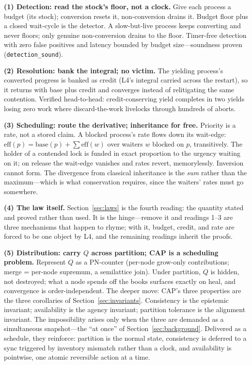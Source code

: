 \documentclass[11pt]{article}
\begin{document}
\textbf{(1) Detection: read the stock's floor, not a clock.} Give each
process a budget (its stock); conversion resets it, non-conversion
drains it. Budget floor plus a closed wait-cycle is the detector. A
slow-but-live process keeps converting and never floors; only genuine
non-conversion drains to the floor. Timer-free detection with zero
false positives and latency bounded by budget size---soundness proven
(\texttt{detection\_sound}).

\textbf{(2) Resolution: bank the integral; no victim.} The yielding
process's converted progress is banked as credit (L4's integral carried
across the restart), so it returns with base plus credit and converges
instead of relitigating the same contention. Verified head-to-head:
credit-conserving yield completes in two yields losing zero work where
discard-the-work livelocks through hundreds of aborts.

\textbf{(3) Scheduling: route the derivative; inheritance for free.}
Priority is a rate, not a stored claim. A blocked process's rate flows
down its wait-edge: $\mathrm{eff}(p) = \mathrm{base}(p) + \sum
\mathrm{eff}(w)$ over waiters $w$ blocked on $p$, transitively. The
holder of a contended lock is funded in exact proportion to the urgency
waiting on it; on release the wait-edge vanishes and rates revert,
memorylessly. Inversion cannot form. The divergence from classical
inheritance is the \emph{sum} rather than the maximum---which is what
conservation requires, since the waiters' rates must go somewhere.

\textbf{(4) The law itself.} Section~\ref{sec:laws} is the fourth
reading: the quantity stated and proved rather than used. It is the
hinge---remove it and readings 1--3 are three mechanisms that happen to
rhyme; with it, budget, credit, and rate are forced to be one object by
L4, and the remaining readings inherit the proofs.

\textbf{(5) Distribution: carry $Q$ across partition; CAP is a
scheduling problem.} Represent $Q$ as a PN-counter (per-node grow-only
contributions; merge = per-node supremum, a semilattice join). Under
partition, $Q$ is hidden, not destroyed; what a node spends off the
books surfaces exactly on heal, and convergence is order-independent.
The deeper move: CAP's three properties are the three corollaries of
Section~\ref{sec:invariants}. Consistency is the epistemic invariant;
availability is the agency invariant; partition tolerance is the
alignment invariant. The impossibility arises only when the three are
demanded as a simultaneous snapshot---the ``at once'' of
Section~\ref{sec:background}. Delivered as a schedule, they reinforce:
partition is the normal state, consistency is deferred to a sync
triggered by inventory mismatch rather than a clock, and availability
is pointwise, one atomic reversible action at a time.
\end{document}
